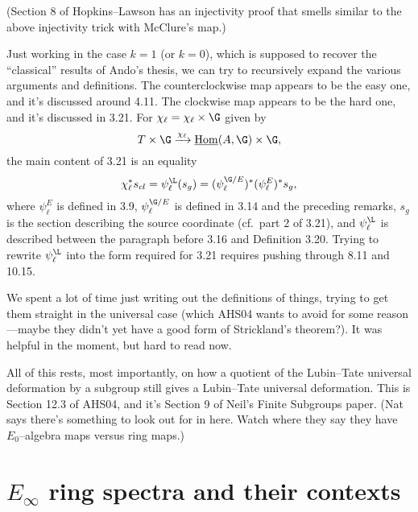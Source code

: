 (Section 8 of Hopkins--Lawson has an injectivity proof that smells similar to the above injectivity trick with McClure's map.)

Just working in the case $k = 1$ (or $k = 0$), which is supposed to recover the ``classical'' results of Ando's thesis, we can try to recursively expand the various arguments and definitions.  The counterclockwise map appears to be the easy one, and it's discussed around 4.11.  The clockwise map appears to be the hard one, and it's discussed in 3.21.  For $\chi_\ell = \chi_\ell \times \G$ given by \[T \times \G \xrightarrow{\chi_\ell} \underline{\operatorname{Hom}}(A, \G) \times \G,\] the main content of 3.21 is an equality \[\chi_\ell^* s_{cl} = \psi_\ell^{\L}(s_g) = (\psi_\ell^{\G/E})^* (\psi_\ell^E)^* s_g,\] where $\psi_\ell^E$ is defined in 3.9, $\psi_\ell^{\G/E}$ is defined in 3.14 and the preceding remarks, $s_g$ is the section describing the source coordinate (cf.\ part 2 of 3.21), and $\psi_\ell^{\L}$ is described between the paragraph before 3.16 and Definition 3.20.  Trying to rewrite $\psi_\ell^{\L}$ into the form required for 3.21 requires pushing through 8.11 and 10.15.

We spent a lot of time just writing out the definitions of things, trying to get them straight in the universal case (which AHS04 wants to avoid for some reason---maybe they didn't yet have a good form of Strickland's theorem?).  It was helpful in the moment, but hard to read now.

All of this rests, most importantly, on how a quotient of the Lubin--Tate universal deformation by a subgroup still gives a Lubin--Tate universal deformation.  This is Section 12.3 of AHS04, and it's Section 9 of Neil's Finite Subgroups paper.  (Nat says there's something to look out for in here.  Watch where they say they have $E_0$--algebra maps versus ring maps.)






\section{\texorpdfstring{$E_\infty$}{Eoo} ring spectra and their contexts}

